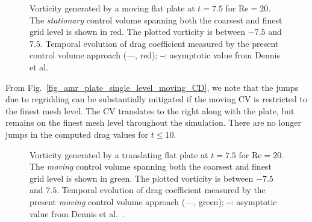 \documentclass[review]{elsarticle}
\def \Re{\text{Re}}
\begin{document}
\begin{figure}[H]
  \centering
  \caption{ 
  Vorticity generated by a moving flat plate at $t=7.5$ for $\Re = 20$. The \emph{stationary} control
  volume spanning both the coarsest and finest grid level is shown in red.
  The plotted vorticity is between $-7.5$ and $7.5$.
   Temporal evolution of drag coefficient measured by the present control
    volume approach (---, red); 
     \texttt{---}: asymptotic value from Dennis et al.~\cite{Dennis93}}
  \label{fig_amr_plate_stationary_multiple_levels}
\end{figure}

\noindent From Fig.~\ref{fig_amr_plate_single_level_moving_CD}, we note 
that the jumps due to regridding can be substantially mitigated if the moving 
CV is restricted to the finest mesh level. The CV translates to the right along 
with the plate, but remains on the finest mesh level throughout the simulation.
There are no longer jumps in the computed drag values for $t \le 10$.

\begin{figure}[H]
  \centering
  \caption{ 
  Vorticity generated by a translating flat plate at $t=7.5$ for $\Re = 20$. The 
  \emph{moving} control volume spanning both the coarsest and finest grid level 
  is shown in green. The plotted vorticity is between $-7.5$ and $7.5$.
   Temporal evolution of drag coefficient measured by the present \emph{moving} control
    volume approach (---, green); 
     \texttt{---}: asymptotic value from Dennis et al.~\cite{Dennis93}.}
  \label{fig_amr_plate_moving_single_level}
\end{figure}
\end{document}
